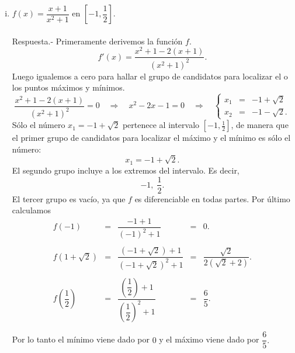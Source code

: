 \begin{enumerate}[\bfseries 1.]
\begin{enumerate}[(i)]
	    \item $f(x)=\dfrac{x+1}{x^2+1}$ en $\left[-1,\dfrac{1}{2}\right]$.\\\\
		Respuesta.-\; Primeramente derivemos la función $f$.
		$$f'(x)=\dfrac{x^2+1-2(x+1)}{\left(x^2+1\right)^2}.$$
		Luego igualemos a cero para hallar el grupo de candidatos para localizar el o los puntos máximos y mínimos.
		$$\dfrac{x^2+1-2(x+1)}{\left(x^2+1\right)^2}=0 \quad \Rightarrow \quad x^2-2x-1=0\quad \Rightarrow \quad \left\{\begin{array}{rcl}x_1&=&-1+\sqrt{2}\\ x_2 &=& -1-\sqrt{2}. \end{array}\right.$$
		Sólo el número $x_1=-1+\sqrt{2}$ pertenece al intervalo $[-1,\frac{1}{2}]$, de manera que el primer grupo de candidatos para localizar el máximo y el mínimo es sólo el número:
		$$x_1=-1+\sqrt{2}.$$
		El segundo grupo incluye a los extremos del intervalo. Es decir,
		$$-1,\;\dfrac{1}{2}.$$
		El tercer grupo es vacío, ya que $f$ es diferenciable en todas partes. Por último calculamos 
		$$\begin{array}{ccccl}
		    f\left(-1\right) &=& \dfrac{-1+1}{\left(-1\right)^2+1}&=&0.\\\\
		    f\left(1+\sqrt{2}\right) &=& \dfrac{\left(-1+\sqrt{2}\right)+1}{\left(-1+\sqrt{2}\right)^2+1} &=&\dfrac{\sqrt{2}}{2\left(\sqrt{2}+2\right)}.\\\\
		    f\left(\dfrac{1}{2}\right) &=& \dfrac{\left(\dfrac{1}{2}\right)+1}{\left(\dfrac{1}{2}\right)^2+1} &=&\dfrac{6}{5}.\\\\
		\end{array}$$
		Por lo tanto el mínimo viene dado por $0$ y el máximo viene dado por $\dfrac{6}{5}.$\\\\


\end{enumerate}
\end{enumerate}
